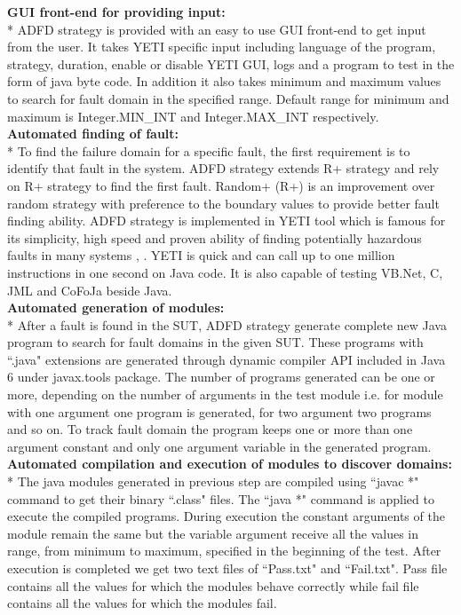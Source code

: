 \documentclass[runningheads,a4paper]{llncs}
\begin{document}
\noindent \textbf{GUI front-end for providing input:}\\*
\indent ADFD strategy is provided with an easy to use GUI front-end to get input from the user. It takes YETI specific input including language of the program, strategy, duration, enable or disable YETI GUI, logs and a program to test in the form of java byte code. In addition it also takes minimum and maximum values to search for fault domain in the specified range. Default range for minimum and maximum is Integer.MIN\_INT and Integer.MAX\_INT respectively.\\

\noindent \textbf{Automated finding of fault:}\\*
\indent To find the failure domain for a specific fault, the first requirement is to identify that fault in the system. ADFD strategy extends R+ strategy and rely on R+ strategy to find the first fault. Random+ (R+) is an improvement over random strategy with preference to the boundary values to provide better fault finding ability. ADFD strategy is implemented in YETI tool which is famous for its simplicity, high speed and proven ability of finding potentially hazardous faults in many systems \cite{Oriol2011},  \cite{Oriol2012}. YETI is quick and can call up to one million instructions in one second on Java code. It is also capable of testing VB.Net, C, JML and CoFoJa beside Java. \\

\noindent \textbf{Automated generation of modules:}\\*
\indent  After a fault is found in the SUT, ADFD strategy generate complete new Java program to search for fault domains in the given SUT.  These programs with ``.java" extensions are generated through dynamic compiler API included in Java 6 under javax.tools package. The number of programs generated can be one or more, depending on the number of arguments in the test module i.e. for module with one argument one program is generated, for two argument two programs and so on. To track fault domain the program keeps one or more than one argument constant and only one argument variable in the generated program.\\

\noindent \textbf{Automated compilation and execution of modules to discover domains:}\\*
\indent  The java modules generated in previous step are compiled using ``javac *" command to get their binary ``.class" files. The ``java *" command is applied to execute the compiled programs. During execution the constant arguments of the module remain the same but the variable argument receive all the values in range, from minimum to maximum, specified in the beginning of the test. After execution is completed we get two text files of ``Pass.txt" and ``Fail.txt". Pass file contains all the values for which the modules behave correctly while fail file contains all the values for which the modules fail.\\
\end{document}
